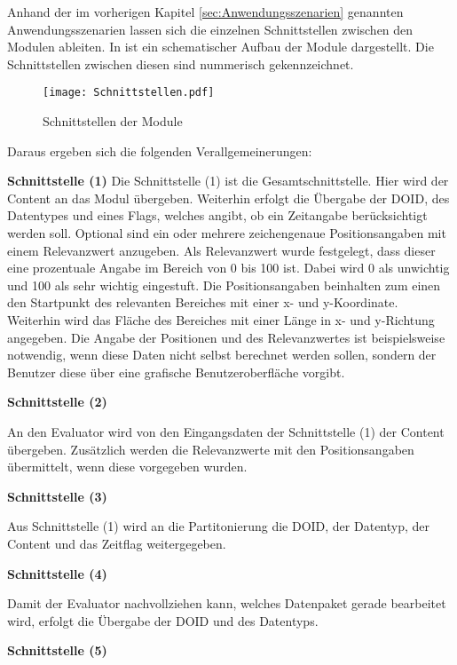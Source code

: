 Anhand der im vorherigen Kapitel \ref{sec:Anwendungsszenarien} genannten Anwendungsszenarien lassen
sich die einzelnen Schnittstellen zwischen den Modulen ableiten. In
 ist ein schematischer Aufbau der Module
dargestellt. Die Schnittstellen zwischen diesen sind nummerisch gekennzeichnet.

\begin{figure}[H]
\centering
\texttt{[image: Schnittstellen.pdf]}
\caption{Schnittstellen der Module}
\label{fig:Schnittstellen}
\end{figure}

Daraus ergeben sich die folgenden Verallgemeinerungen:

\textbf{Schnittstelle (1)}\newline
Die Schnittstelle (1) ist die Gesamtschnittstelle. Hier wird der
Content an das Modul übergeben. Weiterhin erfolgt die Übergabe der \gls{DOID}, des
Datentypes und eines Flags, welches angibt, ob ein Zeitangabe berücksichtigt
werden soll.
Optional sind ein oder mehrere zeichengenaue Positionsangaben mit einem
Relevanzwert anzugeben. Als Relevanzwert wurde festgelegt, dass dieser eine
prozentuale Angabe im Bereich von 0 bis 100 ist. Dabei wird 0 als unwichtig und
100 als sehr wichtig eingestuft. Die Positionsangaben beinhalten zum einen den
Startpunkt des relevanten Bereiches mit einer x- und y-Koordinate. Weiterhin
wird das Fläche des Bereiches mit einer Länge in x- und y-Richtung angegeben.
Die Angabe der Positionen und des Relevanzwertes ist beispielsweise notwendig,
wenn diese Daten nicht selbst berechnet werden sollen, sondern der Benutzer
diese über eine grafische Benutzeroberfläche vorgibt.

\textbf{Schnittstelle (2)} 

An den Evaluator wird von den Eingangsdaten der Schnittstelle (1)
der Content übergeben. Zusätzlich werden die Relevanzwerte mit den
Positionsangaben übermittelt, wenn diese vorgegeben wurden.

\textbf{Schnittstelle (3)} 

Aus Schnittstelle (1) wird an die Partitonierung
die \gls{DOID}, der Datentyp, der Content und das Zeitflag weitergegeben.

\textbf{Schnittstelle (4)} 

Damit der Evaluator nachvollziehen kann, welches Datenpaket gerade bearbeitet
wird, erfolgt die Übergabe der \gls{DOID} und des Datentyps.  

\textbf{Schnittstelle (5)}

